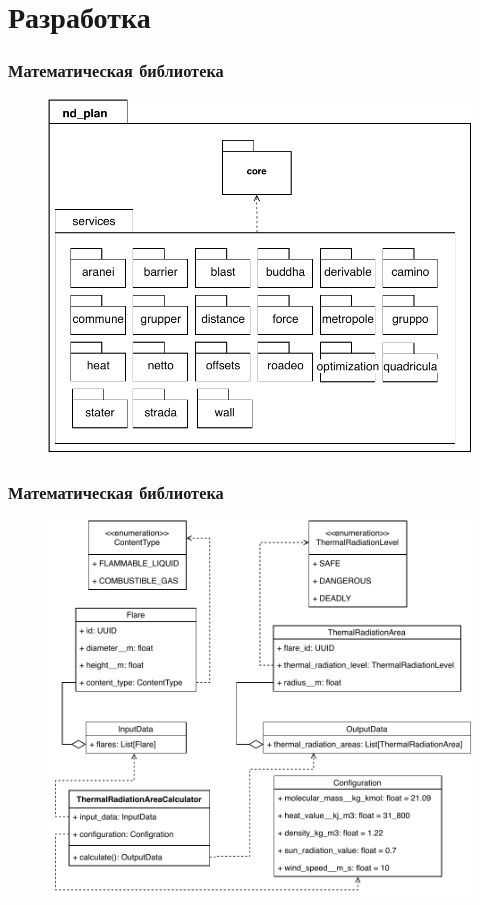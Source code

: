 \section{Разработка}


\begin{frame}
\frametitle{Математическая библиотека}
\begin{figure}
    \includegraphics[scale=.5]{pictures/implementation/math_packages}
\end{figure}
\end{frame}


\begin{frame}
\frametitle{Математическая библиотека}
\begin{figure}
    \includegraphics[scale=.5]{pictures/implementation/math_classes}
\end{figure}
\end{frame}



